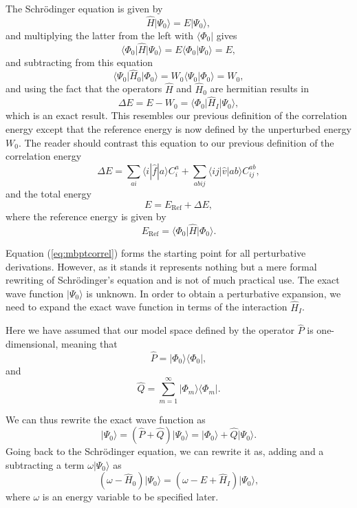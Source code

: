   The Schr\"odinger equation is given by
  \[
  \hat{H}\vert \Psi_0\rangle = E\vert \Psi_0\rangle,
  \]
  and multiplying the latter from the left with $\langle \Phi_0\vert $
  gives
  \[
  \langle \Phi_0\vert \hat{H}\vert \Psi_0\rangle = E\langle
  \Phi_0\vert \Psi_0\rangle=E,
  \]
  and subtracting from this equation
  \[
  \langle \Psi_0\vert \hat{H}_0\vert \Phi_0\rangle= W_0\langle
  \Psi_0\vert \Phi_0\rangle=W_0,
  \]
  and using the fact that the  operators $\hat{H}$ and $\hat{H}_0$
  are hermitian results in
  \begin{equation}\label{eq:mbptcorrel}
  \Delta E=E-W_0=\langle \Phi_0\vert \hat{H}_I\vert \Psi_0\rangle,
  \end{equation}
  which is an exact result. This resembles our previous definition of the correlation energy except that the reference energy is now defined
by the unperturbed energy $W_0$. The reader should contrast this equation to our previous definition of the correlation energy
  \[
  \Delta E=\sum_{ai}\langle i| \hat{f}|a \rangle C_{i}^{a}+
  \sum_{abij}\langle ij | \hat{v}| ab \rangle C_{ij}^{ab},
  \]
and the total energy
  \[
  E=E_{\mathrm{Ref}}+\Delta E,
  \]
where the reference energy is given by
\[   
   E_{\mathrm{Ref}}= \langle \Phi_0 \vert \hat{H} \vert \Phi_0\rangle.
\]

  Equation (\ref{eq:mbptcorrel}) forms the starting point for all perturbative
  derivations. However, as it stands it represents nothing but a mere
  formal rewriting of Schr\"odinger's equation and is not of much
  practical use. The exact wave function $\vert \Psi_0\rangle$ is
  unknown. In order to obtain a perturbative expansion, we need to
  expand the exact wave function in terms of the interaction
  $\hat{H}_I$.

  Here we have assumed that our model space defined by the operator
  $\hat{P}$ is one-dimensional, meaning that
  \[
  \hat{P}= \vert \Phi_0\rangle \langle \Phi_0\vert ,
  \]
  and
  \[
  \hat{Q}=\sum_{m=1}^{\infty}\vert \Phi_m\rangle \langle \Phi_m\vert .
  \]


  We can thus rewrite the exact wave function as
  \[
  \vert \Psi_0\rangle= (\hat{P}+\hat{Q})\vert \Psi_0\rangle=\vert
  \Phi_0\rangle+\hat{Q}\vert \Psi_0\rangle.
  \]
  Going back to the Schr\"odinger equation, we can rewrite it as,
  adding and a subtracting a term $\omega \vert \Psi_0\rangle$ as
  \[
  \left(\omega-\hat{H}_0\right)\vert
  \Psi_0\rangle=\left(\omega-E+\hat{H}_I\right)\vert \Psi_0\rangle,
  \]
  where $\omega$ is an energy variable to be specified later.


